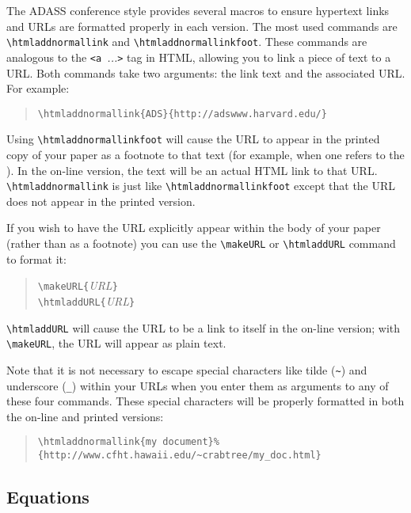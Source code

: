 \documentclass[11pt,twoside]{article}
\def\arg#1{{\it#1\/}}
\begin{document}
The ADASS conference style provides several macros to ensure hypertext
links and URLs are formatted properly in each version.  The most
used commands are \verb+\htmladdnormallink+ and
\verb+\htmladdnormallinkfoot+.  These commands are analogous to the
\verb+<a +\arg{...}\verb+>+ tag in HTML, allowing you to link a piece
of text to a URL.  Both commands take two arguments: the link text and
the associated URL\@.  For example:
\begin{quote}
\verb+\htmladdnormallink{ADS}{http://adswww.harvard.edu/}+
\end{quote}
Using \verb+\htmladdnormallinkfoot+ will cause the URL to appear in
the printed copy of your paper as a footnote to that text (for example,
when one refers to the
).  In the
on-line version, the text will be an actual HTML link to that URL.
\verb+\htmladdnormallink+ is just like \verb+\htmladdnormallinkfoot+
except that the URL does not appear in the printed version.  

If you wish to have the URL explicitly appear within the body of your
paper (rather than as a footnote) you can use the \verb+\makeURL+ or 
\verb+\htmladdURL+ command to format it:
\begin{quote}
\verb+\makeURL{+\arg{URL}\verb+}+\\
\verb+\htmladdURL{+\arg{URL}\verb+}+
\end{quote}
\verb+\htmladdURL+ will cause the URL to be a link to itself in the
on-line version; with \verb+\makeURL+, the URL will appear as plain
text.  

Note that it is not necessary to escape special characters like tilde
(\verb+~+) and underscore (\verb+_+) within your URLs when you enter
them as arguments to any of these four commands.  These special
characters will be properly formatted in both the on-line and printed
versions:  
\begin{quote}
\verb+\htmladdnormallink{my document}%+\\
\verb+{http://www.cfht.hawaii.edu/~crabtree/my_doc.html}+
\end{quote}

\subsection{Equations}
\end{document}
